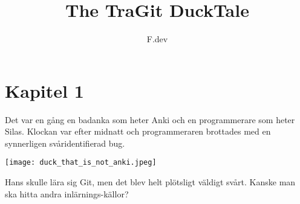 \documentclass[a4paper]{article}
\begin{document}
\title{The TraGit DuckTale}
\author{F.dev}
\maketitle

\section*{Kapitel 1}
Det var en gång en badanka som heter Anki och en programmerare som heter Silas.
Klockan var efter midnatt och programmeraren brottades med en synnerligen svåridentifierad bug.

\begin{center}
	\texttt{[image: duck\_that\_is\_not\_anki.jpeg]}
\end{center}

Hans skulle lära sig Git, men det blev helt plötsligt väldigt svårt. Kanske man ska hitta andra inlärnings-källor?

\end{document}
